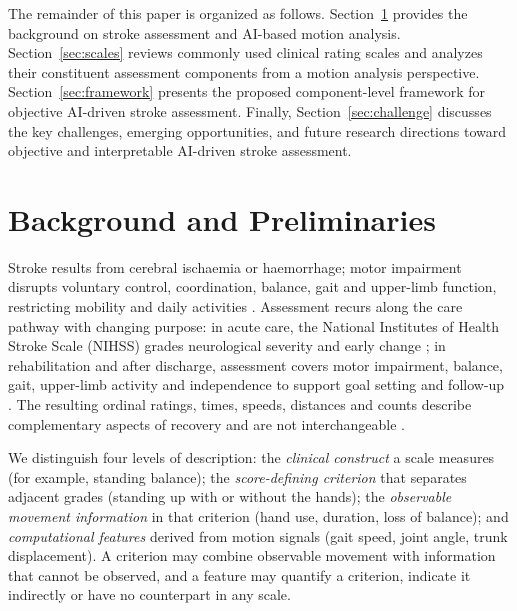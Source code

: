 \documentclass[11pt]{article}
\begin{document}
The remainder of this paper is organized as follows. Section~\ref{sec:background} provides the background on stroke assessment and AI-based motion analysis. Section~\ref{sec:scales} reviews commonly used clinical rating scales and analyzes their constituent assessment components from a motion analysis perspective. Section~\ref{sec:framework} presents the proposed component-level framework for objective AI-driven stroke assessment. Finally, Section~\ref{sec:challenge} discusses the key challenges, emerging opportunities, and future research directions toward objective and interpretable AI-driven stroke assessment.


\section{Background and Preliminaries}
\label{sec:background}

Stroke results from cerebral ischaemia or haemorrhage; motor impairment disrupts voluntary control, coordination, balance, gait and upper-limb function, restricting mobility and daily activities \cite{WHO2025StrokeFactSheet,S1VADoD2024StrokeRehab}. Assessment recurs along the care pathway with changing purpose: in acute care, the National Institutes of Health Stroke Scale (NIHSS) grades neurological severity and early change \cite{S1Prabhakaran2026AHAASAAIS,ScaleBrott1989NIHSS}; in rehabilitation and after discharge, assessment covers motor impairment, balance, gait, upper-limb activity and independence to support goal setting and follow-up \cite{S1Winstein2016AHAASARehab,S1VADoD2024StrokeRehab,S1NICE2023NG236}. The resulting ordinal ratings, times, speeds, distances and counts describe complementary aspects of recovery and are not interchangeable \cite{ScaleHarrison2013Clinimetric,CoreKwakkel2017SRRRSensorimotor,CoreVanCriekinge2024SRRRBalanceMobility}.

We distinguish four levels of description: the \emph{clinical construct} a scale measures (for example, standing balance); the \emph{score-defining criterion} that separates adjacent grades (standing up with or without the hands); the \emph{observable movement information} in that criterion (hand use, duration, loss of balance); and \emph{computational features} derived from motion signals (gait speed, joint angle, trunk displacement). A criterion may combine observable movement with information that cannot be observed, and a feature may quantify a criterion, indicate it indirectly or have no counterpart in any scale.
\end{document}
